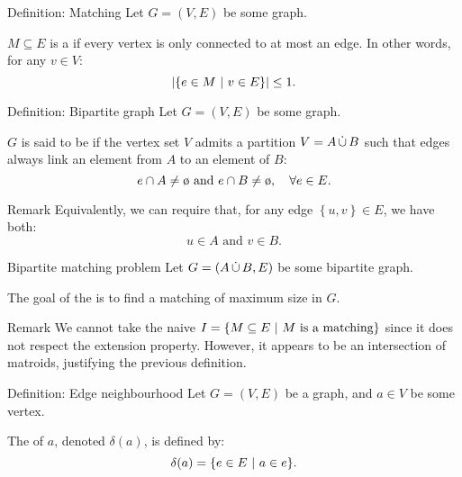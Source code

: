 \documentclass[a4paper]{article}
\begin{document}
\begin{parag}{Definition: Matching}
    Let $G = \left(V, E\right)$ be some graph. 

    $M \subseteq E$ is a  if every vertex is only connected to at most an edge. In other words, for any $v \in V$: 
    \[\left|\left\{e \in M \suchthat v \in E\right\}\right| \leq 1.\]
\end{parag}

\begin{parag}{Definition: Bipartite graph}
    Let $G = \left(V, E\right)$ be some graph.

    $G$ is said to be  if the vertex set $V$ admits a partition $V = A \operatorname*{\dot{\cup}} B$ such that edges always link an element from $A$ to an element of $B$: 
    \[e \cap A \neq \o \text{ and } e \cap B \neq \o, \mathspace \forall e \in E.\]

    \begin{subparag}{Remark}
        Equivalently, we can require that, for any edge $\left\{u, v\right\} \in E$, we have both:
        \[u \in A \text{ and } v \in B.\]
    \end{subparag}
\end{parag}

\begin{parag}{Bipartite matching problem}
    Let $G = \left(A \dcup B, E\right)$ be some bipartite graph. 

    The goal of the  is to find a matching of maximum size in $G$.

    \begin{subparag}{Remark}
        We cannot take the naive $I = \left\{M \subseteq E \suchthat \text{$M$ is a matching}\right\}$ since it does not respect the extension property. However, it appears to be an intersection of matroids, justifying the previous definition.
    \end{subparag}
\end{parag}

\begin{parag}{Definition: Edge neighbourhood}
    Let $G = \left(V, E\right)$ be a graph, and $a \in V$ be some vertex.

    The  of $a$, denoted $\delta\left(a\right)$, is defined by: 
    \[\delta\left(a\right) = \left\{e \in E \suchthat a \in e\right\}.\]
\end{parag}
\end{document}
